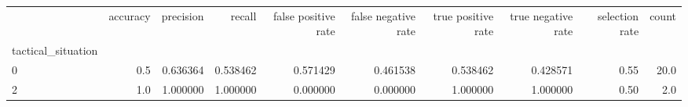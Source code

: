 \begin{tabular}{lrrrrrrrrr}
\toprule
{} &  accuracy &  precision &    recall &  false positive rate &  false negative rate &  true positive rate &  true negative rate &  selection rate &  count \\
tactical\_situation &           &            &           &                      &                      &                     &                     &                 &        \\
\midrule
0                  &       0.5 &   0.636364 &  0.538462 &             0.571429 &             0.461538 &            0.538462 &            0.428571 &            0.55 &   20.0 \\
2                  &       1.0 &   1.000000 &  1.000000 &             0.000000 &             0.000000 &            1.000000 &            1.000000 &            0.50 &    2.0 \\
\bottomrule
\end{tabular}
